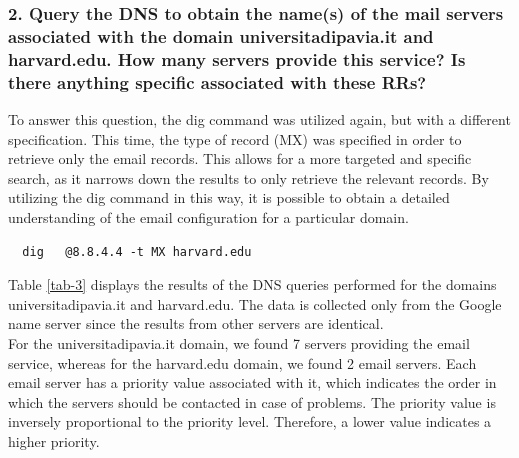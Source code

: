 \documentclass[eng]{class}
\begin{document}
\subsubsection*{2. Query the DNS to obtain the name(s) of the mail servers associated with the
  domain universitadipavia.it and harvard.edu. How many servers
  provide this service? Is there anything specific associated with these RRs?}

To answer this question, the dig command was utilized again, but with a different specification.
This time, the type of record (MX) was specified in order to retrieve only the email records.
This allows for a more targeted and specific search, as it narrows down the results to only retrieve the relevant records.
By utilizing the dig command in this way, it is possible to obtain a detailed understanding of the email configuration for a particular domain.
\begin{lstlisting}
  dig   @8.8.4.4 -t MX harvard.edu
\end{lstlisting}
Table \ref*{tab-3} displays the results of the DNS queries performed for the domains universitadipavia.it and harvard.edu.
The data is collected only from the Google name server since the results from other servers are identical.\\
For the universitadipavia.it domain, we found 7 servers providing the email service, whereas for the harvard.edu domain, we found 2 email servers.
Each email server has a priority value associated with it, which indicates the order in which the servers should be contacted in case of problems.
The priority value is inversely proportional to the priority level. Therefore, a lower value indicates a higher priority.
\end{document}
